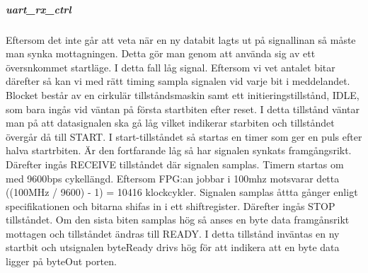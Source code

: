 \documentclass[a4paper]{scrartcl}
\begin{document}
		\subparagraph{uart\_rx\_ctrl}
		Eftersom det inte går att veta när en ny databit lagts ut på signallinan så måste man synka mottagningen. Detta gör man genom att använda sig av ett översnkommet startläge. I detta fall låg signal. Eftersom vi vet antalet bitar därefter så kan 		vi med rätt timing sampla signalen vid varje bit i meddelandet.
		Blocket består av en cirkulär tillståndsmaskin samt ett initieringstillstånd, IDLE, som bara ingås vid väntan på första startbiten efter reset. I detta tillstånd väntar man på att datasignalen ska gå låg vilket indikerar starbiten och tillståndet övergår 		då till START.
		I start-tillståndet så startas en timer som ger en puls efter halva startrbiten. Är den fortfarande låg så har signalen synkats framgångsrikt. Därefter ingås RECEIVE tillståndet där signalen samplas. Timern startas om med 9600bps cykellängd. 			Eftersom FPG:an jobbar i 100mhz motsvarar detta ((100MHz / 9600) - 1) = 10416 klockcykler. 
		Signalen samplas åttta gånger enligt specifikationen och bitarna shifas in i ett shiftregister. Därefter ingås STOP tillståndet. Om den sista biten samplas hög så anses en byte data framgånsrikt mottagen och tillståndet ändras till READY. I detta 			tillstånd inväntas en ny startbit och utsignalen byteReady drivs hög för att indikera att en byte data ligger på byteOut porten.
\end{document}
